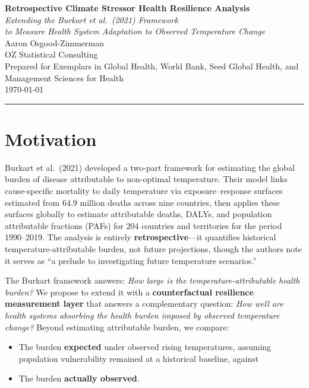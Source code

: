 \documentclass[11pt,a4paper]{article}
\begin{document}
\begin{center}
  {\LARGE\bfseries Retrospective Climate Stressor Health Resilience Analysis}\\[0.5em]
  {\large\itshape Extending the Burkart et al.\ (2021) Framework\\to Measure Health System Adaptation to Observed Temperature Change}\\[1.5em]
  {\normalsize Aaron Osgood-Zimmerman\\OZ Statistical Consulting\\[0.3em]
  Prepared for Exemplars in Global Health, World Bank, Seed Global Health, and Management Sciences for Health\\[0.3em]
  \today}
\end{center}

\vspace{1em}
\hrule
\vspace{1.5em}

\section{Motivation}

Burkart et al.\ (2021) developed a two-part framework for estimating the global burden of disease attributable to non-optimal temperature. Their model links cause-specific mortality to daily temperature via exposure--response surfaces estimated from 64.9 million deaths across nine countries, then applies these surfaces globally to estimate attributable deaths, DALYs, and population attributable fractions (PAFs) for 204 countries and territories for the period 1990--2019. The analysis is entirely \textbf{retrospective}---it quantifies historical temperature-attributable burden, not future projections, though the authors note it serves as ``a prelude to investigating future temperature scenarios.''

The Burkart framework answers: \emph{How large is the temperature-attributable health burden?} We propose to extend it with a \textbf{counterfactual resilience measurement layer} that answers a complementary question: \emph{How well are health systems absorbing the health burden imposed by observed temperature change?} Beyond estimating attributable burden, we compare:
\begin{itemize}[nosep]
  \item The burden \textbf{expected} under observed rising temperatures, assuming population vulnerability remained at a historical baseline, against
  \item The burden \textbf{actually observed}.
\end{itemize}
\end{document}
